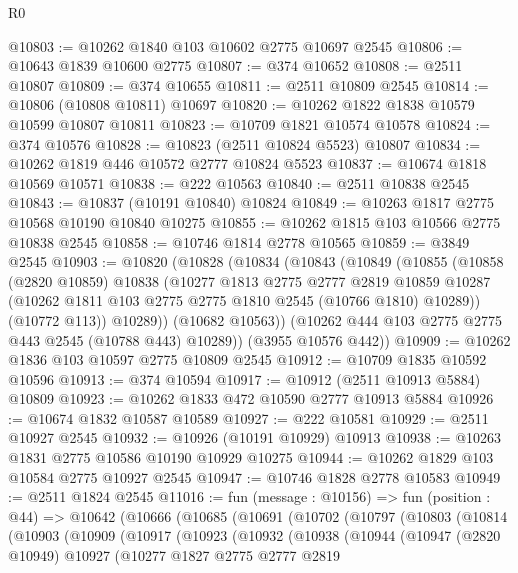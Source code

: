 \begin{lexlean}{R0}
\begin{coremodule}
@10803 := @10262 @1840 @103 @10602 @2775 @10697 @2545
@10806 := @10643 @1839 @10600 @2775
@10807 := @374 @10652
@10808 := @2511 @10807
@10809 := @374 @10655
@10811 := @2511 @10809 @2545
@10814 := @10806 (@10808 @10811) @10697
@10820 := @10262 @1822 @1838 @10579 @10599 @10807 @10811
@10823 := @10709 @1821 @10574 @10578
@10824 := @374 @10576
@10828 := @10823 (@2511 @10824 @5523) @10807
@10834 := @10262 @1819 @446 @10572 @2777 @10824 @5523
@10837 := @10674 @1818 @10569 @10571
@10838 := @222 @10563
@10840 := @2511 @10838 @2545
@10843 := @10837 (@10191 @10840) @10824
@10849 := @10263 @1817 @2775 @10568 @10190 @10840 @10275
@10855 := @10262 @1815 @103 @10566 @2775 @10838 @2545
@10858 := @10746 @1814 @2778 @10565
@10859 := @3849 @2545
@10903 := @10820
    (@10828
      (@10834
        (@10843
          (@10849
            (@10855
              (@10858
                (@2820 @10859)
                @10838
                (@10277
                  @1813
                  @2775
                  @2777
                  @2819
                  @10859
                  @10287
                  (@10262 @1811 @103 @2775 @2775 @1810 @2545 (@10766 @1810) @10289))
                (@10772 @113))
              @10289))
          (@10682 @10563))
        (@10262 @444 @103 @2775 @2775 @443 @2545 (@10788 @443) @10289))
      (@3955 @10576 @442))
@10909 := @10262 @1836 @103 @10597 @2775 @10809 @2545
@10912 := @10709 @1835 @10592 @10596
@10913 := @374 @10594
@10917 := @10912 (@2511 @10913 @5884) @10809
@10923 := @10262 @1833 @472 @10590 @2777 @10913 @5884
@10926 := @10674 @1832 @10587 @10589
@10927 := @222 @10581
@10929 := @2511 @10927 @2545
@10932 := @10926 (@10191 @10929) @10913
@10938 := @10263 @1831 @2775 @10586 @10190 @10929 @10275
@10944 := @10262 @1829 @103 @10584 @2775 @10927 @2545
@10947 := @10746 @1828 @2778 @10583
@10949 := @2511 @1824 @2545
@11016 := fun (message : @10156) =>
  fun (position : @44) =>
  @10642
    (@10666
      (@10685
        (@10691
          (@10702
            (@10797
              (@10803
                (@10814
                  (@10903
                    (@10909
                      (@10917
                        (@10923
                          (@10932
                            (@10938
                              (@10944
                                (@10947
                                  (@2820 @10949)
                                  @10927
                                  (@10277
                                    @1827
                                    @2775
                                    @2777
                                    @2819

\end{coremodule}
\end{lexlean}
